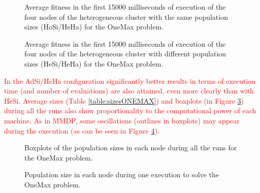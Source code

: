 \documentclass[final,1p,times]{elsarticle}
\begin{document}
\begin{figure}[htb]
\centering
{}
\caption{Average fitness in the first 15000 milliseconds of execution of the four nodes of the heterogeneous cluster with the same population sizes (HoSi/HeHa) for the OneMax problem.}
\label{fig:gensonemaxhomosize}
\end{figure}

\begin{figure}[htb]
\centering
{}
\caption{Average fitness in the first 15000 milliseconds of execution of the four nodes of the heterogeneous cluster with different population sizes (HeSi/HeHa) for the OneMax problem.}
\label{fig:gensonemaxheterosize}
\end{figure}


\textcolor{red}{In the AdSi/HeHa configuration significantly better results in terms of execution time (and number of evaluations) are also attained, even more clearly than with HeSi. Average sizes (Table \ref{table:sizesONEMAX}) and boxplots (in Figure \ref{fig:sizesONEMAX}) during all the runs also show proportionality to the computational power of each machine. As in MMDP, some oscillations (outlines in boxplots) may appear during the execution (as can be seen in Figure \ref{fig:sizesONEMAX1ejec}).}

\begin{figure}[htb]
\centering
{}
\caption{Boxplots of the population sizes in each node during all the runs for the OneMax problem.}
\label{fig:sizesONEMAX}
\end{figure}

\begin{figure}[htb]
\centering
{}
\caption{Population size in each node during one execution to solve the OneMax problem.}
\label{fig:sizesONEMAX1ejec}
\end{figure}

\begin{table}
\end{table}
\end{document}

